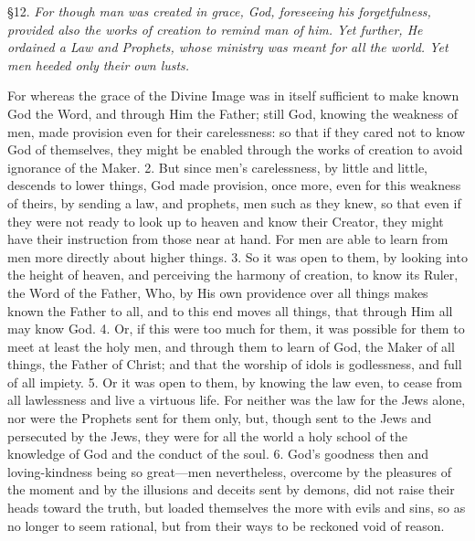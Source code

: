 
§12. \emph{For though man was created in grace, God, foreseeing his forgetfulness, provided also the works of creation to remind man of him. Yet further, He ordained a Law and Prophets, whose ministry was meant for all the world. Yet men heeded only their own lusts.}

For whereas the grace of the Divine Image was in itself sufficient to make known God the Word, and through Him the Father; still God, knowing the weakness of men, made provision even for their carelessness: so that if they cared not to know God of themselves, they might be enabled through the works of creation to avoid ignorance of the Maker. 2. But since men’s carelessness, by little and little, descends to lower things, God made provision, once more, even for this weakness of theirs, by sending a law, and prophets, men such as they knew, so that even if they were not ready to look up to heaven and know their Creator, they might have their instruction from those near at hand. For men are able to learn from men more directly about higher things. 3. So it was open to them, by looking into the height of heaven, and perceiving the harmony of creation, to know its Ruler, the Word of the Father, Who, by His own providence over all things makes known the Father to all, and to this end moves all things, that through Him all may know God. 4. Or, if this were too much for them, it was possible for them to meet at least the holy men, and through them to learn of God, the Maker of all things, the Father of Christ; and that the worship of idols is godlessness, and full of all impiety. 5. Or it was open to them, by knowing the law even, to cease from all lawlessness and live a virtuous life. For neither was the law for the Jews alone, nor were the Prophets sent for them only, but, though sent to the Jews and persecuted by the Jews, they were for all the world a holy school of the knowledge of God and the conduct of the soul. 6. God’s goodness then and loving-kindness being so great—men nevertheless, overcome by the pleasures of the moment and by the illusions and deceits sent by demons, did not raise their heads toward the truth, but loaded themselves the more with evils and sins, so as no longer to seem rational, but from their ways to be reckoned void of reason.

